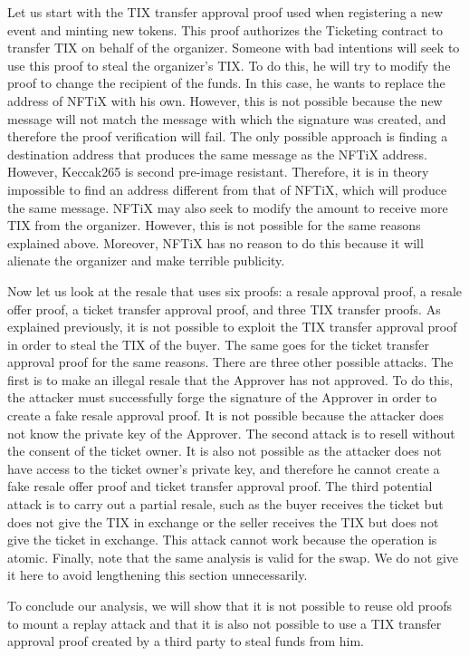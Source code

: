\documentclass[a4paper,11pt,oneside]{report}
\begin{document}
Let us start with the TIX transfer approval proof used when registering a new event and minting new tokens. This proof authorizes the Ticketing contract to transfer TIX on behalf of the organizer. Someone with bad intentions will seek to use this proof to steal the organizer's TIX. To do this, he will try to modify the proof to change the recipient of the funds. In this case, he wants to replace the address of NFTiX with his own. However, this is not possible because the new message will not match the message with which the signature was created, and therefore the proof verification will fail. The only possible approach is finding a destination address that produces the same message as the NFTiX address. However, Keccak265 is second pre-image resistant. Therefore, it is in theory impossible to find an address different from that of NFTiX, which will produce the same message. NFTiX may also seek to modify the amount to receive more TIX from the organizer. However, this is not possible for the same reasons explained above. Moreover, NFTiX has no reason to do this because it will alienate the organizer and make terrible publicity.

Now let us look at the resale that uses six proofs: a resale approval proof, a resale offer proof, a ticket transfer approval proof, and three TIX transfer proofs. As explained previously, it is not possible to exploit the TIX transfer approval proof in order to steal the TIX of the buyer. The same goes for the ticket transfer approval proof for the same reasons. There are three other possible attacks. The first is to make an illegal resale that the Approver has not approved. To do this, the attacker must successfully forge the signature of the Approver in order to create a fake resale approval proof. It is not possible because the attacker does not know the private key of the Approver. The second attack is to resell without the consent of the ticket owner. It is also not possible as the attacker does not have access to the ticket owner's private key, and therefore he cannot create a fake resale offer proof and ticket transfer approval proof. The third potential attack is to carry out a partial resale, such as the buyer receives the ticket but does not give the TIX in exchange or the seller receives the TIX but does not give the ticket in exchange. This attack cannot work because the operation is atomic. Finally, note that the same analysis is valid for the swap. We do not give it here to avoid lengthening this section unnecessarily.

To conclude our analysis, we will show that it is not possible to reuse old proofs to mount a replay attack and that it is also not possible to use a TIX transfer approval proof created by a third party to steal funds from him.
\end{document}
